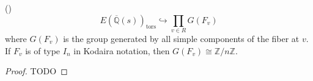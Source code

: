 \documentclass[main]{subfiles}
\begin{document}
\begin{thm}{(\cite[Lem.3.5]{ref:naskrecki2013})}
    \label{thm:torsion}
    \begin{equation}
        E(\overline{\mathbb{Q}}(s))_{\text{tors}} \hookrightarrow \prod_{v \in R} G(F_{v})
    \end{equation}
    where $G(F_{v})$ is the group generated by all simple components of the fiber at $v$.
    If $F_v$ is of type $I_n$ in Kodaira notation, then $G(F_{v}) \cong \mathbb{Z} / n \mathbb{Z}$.
\end{thm}
\begin{proof}
    TODO
\end{proof}
\end{document}
